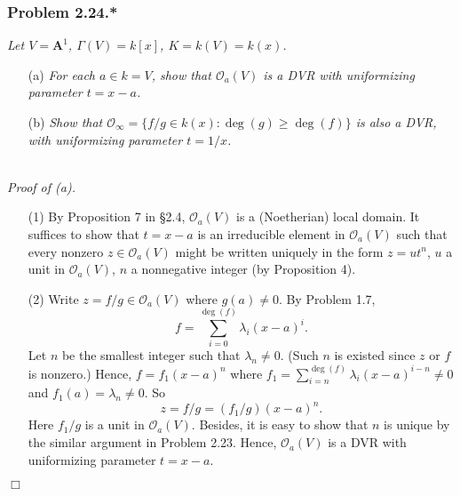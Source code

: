 \documentclass{article}
\begin{document}



\subsubsection*{Problem 2.24.*}
\emph{Let $V = \mathbf{A}^{1}$, $\Gamma(V) = k[x]$, $K = k(V) = k(x)$.}
\begin{enumerate}
\item[(a)]
  \emph{For each $a \in k = V$, show that $\mathscr{O}_{a}(V)$ is a DVR
  with uniformizing parameter $t = x - a$.}

\item[(b)]
  \emph{Show that $\mathscr{O}_{\infty} = \{ f/g \in k(x) : \deg(g) \geq \deg(f) \}$
  is also a DVR, with uniformizing parameter $t = 1/x$.} \\\\
\end{enumerate}



\emph{Proof of (a).}
\begin{enumerate}
\item[(1)]
  By Proposition 7 in \S 2.4,
  $\mathscr{O}_{a}(V)$ is a (Noetherian) local domain.
  It suffices to show that $t = x - a$ is an irreducible element in $\mathscr{O}_{a}(V)$
  such that every nonzero $z \in \mathscr{O}_{a}(V)$ might be written uniquely
  in the form $z = ut^n$, $u$ a unit in $\mathscr{O}_{a}(V)$, $n$ a nonnegative integer
  (by Proposition 4).

\item[(2)]
  Write $z = f/g \in \mathscr{O}_{a}(V)$ where $g(a) \neq 0$.
  By Problem 1.7,
  \[
    f = \sum_{i=0}^{\deg(f)} \lambda_i (x-a)^{i}.
  \]
  Let $n$ be the smallest integer such that $\lambda_n \neq 0$.
  (Such $n$ is existed since $z$ or $f$ is nonzero.)
  Hence, $f = f_1 (x-a)^n$
  where $f_1 = \sum_{i=n}^{\deg(f)} \lambda_i (x-a)^{i-n} \neq 0$ and $f_1(a) = \lambda_n \neq 0$.
  So
  \[
    z = f/g = (f_1/g) (x-a)^n.
  \]
  Here $f_1/g$ is a unit in $\mathscr{O}_{a}(V)$.
  Besides, it is easy to show that $n$ is unique by the similar argument in Problem 2.23.
  Hence, $\mathscr{O}_{a}(V)$ is a DVR with uniformizing parameter $t = x - a$.
\end{enumerate}
$\Box$ \\
\end{document}
